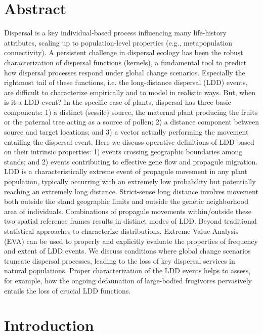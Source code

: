 \documentclass[a4paper, 12pt]{article}
\begin{document}
\section*{Abstract}
\begin{linenumbers}

Dispersal is a key individual-based process influencing many life-history attributes, scaling up to population-level properties (e.g., metapopulation connectivity). A persistent challenge in dispersal ecology has been the robust characterization of dispersal functions (kernels), a fundamental tool to predict how dispersal processes respond under global change scenarios. Especially the rightmost tail of these functions, i.e. the long-distance dispersal (LDD) events, are difficult to characterize empirically and to model in realistic ways. But, when is it a LDD event? In the specific case of plants, dispersal has three basic components: 1) a distinct (sessile) source, the maternal plant producing the fruits or the paternal tree acting as a source of pollen; 2) a distance component between source and target locations; and 3) a vector actually performing the movement entailing the dispersal event. Here we discuss operative definitions of LDD based on their intrinsic properties: 1) events crossing geographic boundaries among stands; and 2) events contributing to effective gene flow and propagule migration. LDD is a characteristically extreme event of propagule movement in any plant population, typically occurring with an extremely low probability but potentially reaching an extremely long distance. Strict-sense long distance involves movement both outside the stand geographic limits and outside the genetic neighborhood area of individuals. Combinations of propagule movements within/outside these two spatial reference frames results in distinct modes of LDD. Beyond traditional statistical approaches to characterize distributions, Extreme Value Analysis (EVA) can be used to properly and explicitly evaluate the properties of frequency and extent of LDD events. We discuss conditions where global change scenarios truncate dispersal processes, leading to the loss of key dispersal services in natural populations. Proper characterization of the LDD events helps to assess, for example, how the ongoing defaunation of large-bodied frugivores pervasively entails the loss of crucial LDD functions.

\newpage

\section*{Introduction}


\end{linenumbers}
\end{document}
